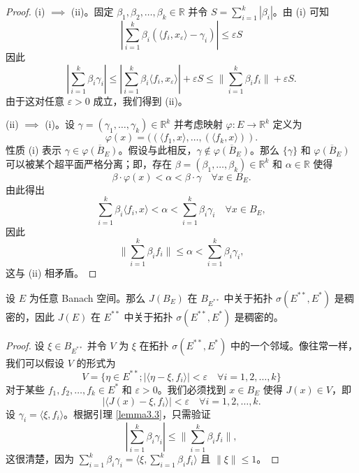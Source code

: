 \begin{proof}
(i) $\implies$ (ii)。固定 $\beta_1, \beta_2, \dots, \beta_k \in \mathbb{R}$ 并令 $S = \sum_{i=1}^k |\beta_i|$。由 (i) 可知
\[ |\sum_{i=1}^k \beta_i (\langle f_i, x_\varepsilon \rangle - \gamma_i)| \le \varepsilon S \]
因此
\[ |\sum_{i=1}^k \beta_i \gamma_i| \le |\sum_{i=1}^k \beta_i \langle f_i, x_\varepsilon \rangle| + \varepsilon S \le \|\sum_{i=1}^k \beta_i f_i\| + \varepsilon S. \]
由于这对任意 $\varepsilon > 0$ 成立，我们得到 (ii)。

(ii) $\implies$ (i)。设 $\gamma = (\gamma_1, \dots, \gamma_k) \in \mathbb{R}^k$ 并考虑映射 $\varphi: E \to \mathbb{R}^k$ 定义为
\[ \varphi(x) = ((\langle f_1, x \rangle, \dots, (\langle f_k, x \rangle)). \]
性质 (i) 表示 $\gamma \in \overline{\varphi(B_E)}$。假设与此相反，$\gamma \notin \overline{\varphi(B_E)}$。那么 $\{\gamma\}$ 和 $\overline{\varphi(B_E)}$ 可以被某个超平面严格分离；即，存在 $\beta = (\beta_1, \dots, \beta_k) \in \mathbb{R}^k$ 和 $\alpha \in \mathbb{R}$ 使得
\[ \beta \cdot \varphi(x) < \alpha < \beta \cdot \gamma \quad \forall x \in B_E. \]
由此得出
\[ \sum_{i=1}^k \beta_i \langle f_i, x \rangle < \alpha < \sum_{i=1}^k \beta_i \gamma_i \quad \forall x \in B_E, \]
因此
\[ \|\sum_{i=1}^k \beta_i f_i\| \le \alpha < \sum_{i=1}^k \beta_i \gamma_i, \]
这与 (ii) 相矛盾。
\end{proof}

\begin{lemma}[Goldstine]\label{lemma3.4}
设 $E$ 为任意 Banach 空间。那么 $J(B_E)$ 在 $B_{E^{**}}$ 中关于拓扑 $\sigma(E^{**}, E^*)$ 是稠密的，因此 $J(E)$ 在 $E^{**}$ 中关于拓扑 $\sigma(E^{**}, E^*)$ 是稠密的。
\end{lemma}

\begin{proof}
设 $\xi \in B_{E^{**}}$ 并令 $V$ 为 $\xi$ 在拓扑 $\sigma(E^{**}, E^*)$ 中的一个邻域。像往常一样，我们可以假设 $V$ 的形式为
\[ V = \{\eta \in E^{**}; |\langle \eta - \xi, f_i \rangle| < \varepsilon \quad \forall i=1, 2, \dots, k\} \]
对于某些 $f_1, f_2, \dots, f_k \in E^*$ 和 $\varepsilon > 0$。我们必须找到 $x \in B_E$ 使得 $J(x) \in V$，即
\[ |\langle J(x) - \xi, f_i \rangle| < \varepsilon \quad \forall i=1, 2, \dots, k. \]
设 $\gamma_i = \langle \xi, f_i \rangle$。根据引理 \ref{lemma3.3}，只需验证
\[ |\sum_{i=1}^k \beta_i \gamma_i| \le \|\sum_{i=1}^k \beta_i f_i\|, \]
这很清楚，因为 $\sum_{i=1}^k \beta_i \gamma_i = \langle \xi, \sum_{i=1}^k \beta_i f_i \rangle$ 且 $\|\xi\| \le 1$。
\end{proof}

